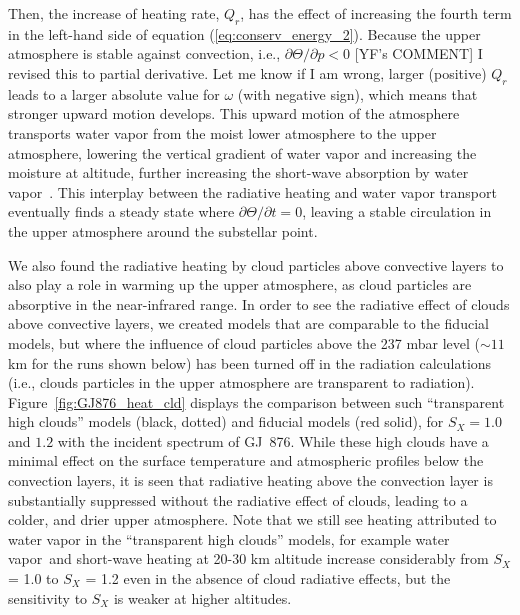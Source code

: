 \documentclass[11pt,numberedappendix,twocolappendix,]{emulateapj}
\newcommand{\dsa}[1]{{\color{blue}#1}}
\newcommand{\yf}[1]{{\color{orange}#1}}
\newcommand{\wv}{water vapor\ }
\begin{document}
Then, the increase of heating rate, $Q_r$, has the effect of increasing the fourth term in the left-hand side of equation (\ref{eq:conserv_energy_2}). 
Because the upper atmosphere is stable against convection, i.e., $\partial \Theta / \partial p < 0 $ \yf{[YF's COMMENT] I revised this to partial derivative. Let me know if I am wrong}, larger (positive) $Q_r$ leads to a larger absolute value for $\omega $ (with negative sign), which means that stronger upward motion develops. 
This upward motion of the atmosphere transports water vapor from the moist lower atmosphere to the upper atmosphere, lowering the vertical gradient of water vapor and increasing the moisture at altitude, further increasing the short-wave absorption by \wv. 
This interplay between the radiative heating and water vapor transport eventually finds a steady state where $\partial \Theta/\partial t = 0$, leaving a stable circulation in the upper atmosphere around the substellar point. 

We also found the radiative heating by cloud particles above convective layers to also play a role in warming up the upper atmosphere, as cloud particles are absorptive in the near-infrared range. 
In order to see the radiative effect of clouds above convective layers, we created models that are comparable to the fiducial models, but where the  influence of cloud particles above the 237 mbar level ($\sim 11$ km for the runs shown below) has been turned off in the radiation calculations (i.e., clouds particles in the upper atmosphere are transparent to radiation). 
Figure~\ref{fig:GJ876_heat_cld} displays the comparison between such ``transparent high clouds'' models (black, dotted) and fiducial models (red solid), for $S_X=1.0$ and $1.2$ with the incident spectrum of GJ~876. 
While these high clouds have a minimal effect on the surface temperature and atmospheric profiles below the convection layers, it is seen that radiative heating above the convection layer is substantially suppressed without the radiative effect of clouds, leading to a colder, and drier upper atmosphere. 
Note that we still see heating attributed to water vapor in the ``transparent high clouds'' models, for example \yf{\wv and short-wave heating at 20-30 km altitude increase considerably from $S_X$ = 1.0 to $S_X$ = 1.2 even in the absence of cloud radiative effects, but the sensitivity to $S_X$ is weaker at higher altitudes. }
\end{document}
